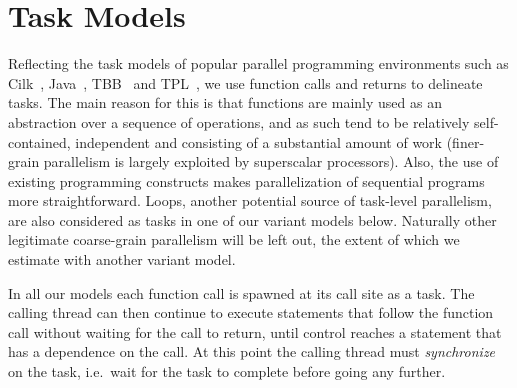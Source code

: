 \section{Task Models} \label{smethod}

Reflecting the task models of popular parallel programming environments such as Cilk~\cite{blumofe96cilk},
Java~\cite{lea00java}, TBB~\cite{reinders07intel} and TPL~\cite{leijen07parallel},
we use function calls and returns to delineate tasks.
The main reason for this is that functions are mainly used as an abstraction over a sequence of operations, and as such tend to be relatively self-contained, independent and consisting of a substantial amount of work
(finer-grain parallelism is largely exploited by superscalar processors).
Also, the use of existing programming constructs makes parallelization of sequential programs more straightforward.
Loops, another potential source of task-level parallelism, are also considered as tasks in one of our variant models below.
Naturally other legitimate coarse-grain parallelism will be left out,
the extent of which we estimate with another variant model.

In all our models each function call is spawned at its call site as a task.
The calling thread can then continue to execute statements that follow the function call without waiting for the call to return,
until control reaches a statement that has a dependence on the call.
At this point the calling thread must \emph{synchronize} on the task,
i.e.\ wait for the task to complete before going any further.

